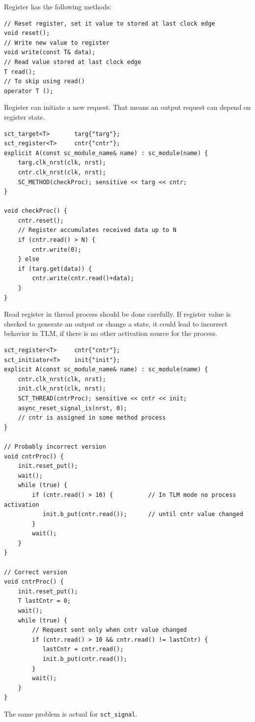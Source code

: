Register has the following methods:

\begin{lstlisting}[style=mycpp]
// Reset register, set it value to stored at last clock edge
void reset();
// Write new value to register
void write(const T& data);
// Read value stored at last clock edge
T read();
// To skip using read()
operator T ();
\end{lstlisting}

Register can initiate a new request. That means an output request can depend on register state.

\begin{lstlisting}[style=mycpp]
sct_target<T>       targ{"targ"};
sct_register<T>     cntr{"cntr"};
explicit A(const sc_module_name& name) : sc_module(name) {
    targ.clk_nrst(clk, nrst);
    cntr.clk_nrst(clk, nrst);
    SC_METHOD(checkProc); sensitive << targ << cntr;
}

void checkProc() {
    cntr.reset();
    // Register accumulates received data up to N
    if (cntr.read() > N) {
        cntr.write(0); 
    } else 
    if (targ.get(data)) {
        cntr.write(cntr.read()+data); 
    }
}
\end{lstlisting}


Read register in thread process should be done carefully. If register value is checked to generate an output or change a state, it could lead to incorrect behavior in TLM, if there is no other activation source for the process. 
\begin{lstlisting}[style=mycpp]
sct_register<T>     cntr{"cntr"};
sct_initiator<T>    init{"init"};
explicit A(const sc_module_name& name) : sc_module(name) {
    cntr.clk_nrst(clk, nrst);
    init.clk_nrst(clk, nrst);
    SCT_THREAD(cntrProc); sensitive << cntr << init;
    async_reset_signal_is(nrst, 0);
    // cntr is assigned in some method process 
}

// Probably incorrect version
void cntrProc() {
    init.reset_put();
    wait();
    while (true) {
        if (cntr.read() > 10) {          // In TLM mode no process activation 
           init.b_put(cntr.read());      // until cntr value changed
        }
        wait();
    }
}

// Correct version
void cntrProc() {
    init.reset_put();
    T lastCntr = 0;
    wait();
    while (true) {
        // Request sent only when cntr value changed  
        if (cntr.read() > 10 && cntr.read() != lastCntr) {
           lastCntr = cntr.read();       
           init.b_put(cntr.read());     
        }
        wait();
    }
}
\end{lstlisting}
The same problem is actual for {\tt sct\_signal}.

